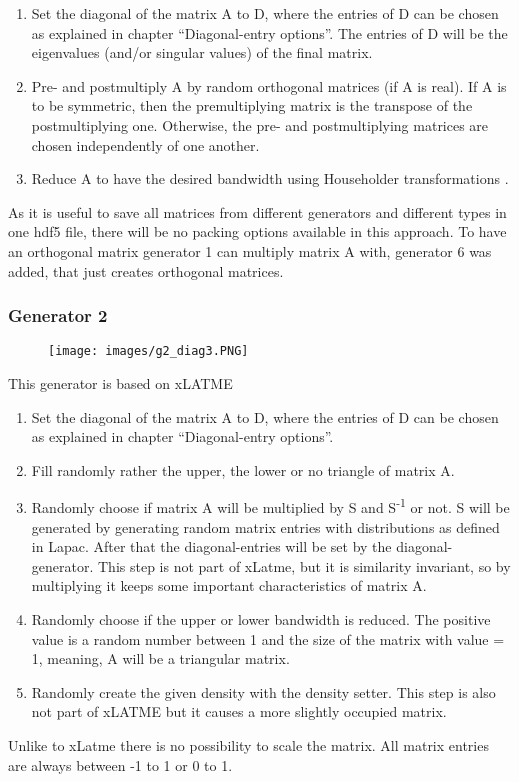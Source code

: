 \documentclass[parskip=full]{scrartcl}
\begin{document}
\begin{enumerate}
	\item Set the diagonal of the matrix A to D, where the entries of D can be chosen as explained in chapter “Diagonal-entry options”. The entries of D will be the eigenvalues (and/or singular values) of the final matrix.
	\item Pre- and postmultiply A by random orthogonal matrices (if A is real). If A is to be symmetric, then the premultiplying matrix is the transpose of the postmultiplying one. Otherwise, the pre- and postmultiplying matrices are chosen independently of one another.
	\item Reduce A to have the desired bandwidth using Householder transformations \cite{numerikskript}.
\end{enumerate}

As it is useful to save all matrices from different generators and different types in one hdf5 file, there will be no packing options available in this approach.
To have an orthogonal matrix generator 1 can multiply matrix A with, generator 6 was added, that just creates orthogonal matrices.

\newpage
\subsubsection{Generator 2}
\begin{figure}[h!]
	\texttt{[image: images/g2\_diag3.PNG]}
\end{figure}
This generator is based on xLATME
\begin{enumerate}
	\item Set the diagonal of the matrix A to D, where the entries of D can be chosen as explained in chapter “Diagonal-entry options”.
	\item Fill randomly rather the upper, the lower or no triangle of matrix A.
	\item Randomly choose if matrix A will be multiplied by S and S\textsuperscript{-1} or not. S will be generated by generating random matrix entries with distributions as defined in Lapac. After that the diagonal-entries will be set by the diagonal-generator.
	This step is not part of xLatme, but it is similarity invariant, so by multiplying it keeps some important characteristics of matrix A.
	\item Randomly choose if the upper or lower bandwidth is reduced. The positive value is a random number between 1 and the size of the matrix with value = 1, meaning, A will be a triangular matrix.
	\item Randomly create the given density with the density setter. This step is also not part of xLATME but it causes a more slightly occupied matrix.
\end{enumerate}
Unlike to xLatme there is no possibility to scale the matrix. All matrix entries are always between -1 to 1 or 0 to 1.
\end{document}

